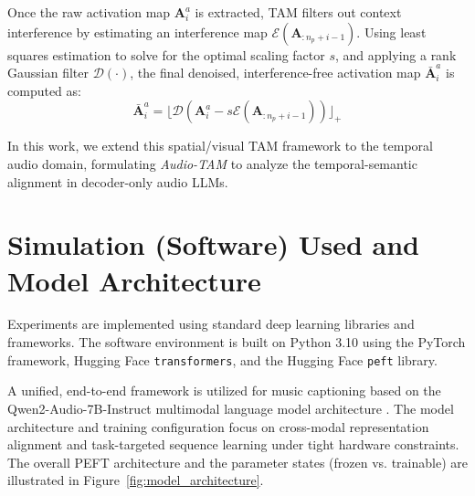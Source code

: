 \documentclass[12pt, conference, letterpaper]{IEEEtran}
\begin{document}
Once the raw activation map $\mathbf{A}^a_i$ is extracted, TAM filters out context interference by estimating an interference map $\mathcal{E}(\mathbf{A}_{:n_p+i-1})$. Using least squares estimation to solve for the optimal scaling factor $s$, and applying a rank Gaussian filter $\mathcal{D}(\cdot)$, the final denoised, interference-free activation map $\bar{\mathbf{A}}^a_i$ is computed as:
\begin{equation}
    \bar{\mathbf{A}}^a_i = \lfloor \mathcal{D}(\mathbf{A}^a_i - s\mathcal{E}(\mathbf{A}_{:n_p+i-1})) \rfloor_+
\end{equation}

In this work, we extend this spatial/visual TAM framework to the temporal audio domain, formulating \textit{Audio-TAM} to analyze the temporal-semantic alignment in decoder-only audio LLMs.

\section{Simulation (Software) Used and Model Architecture}
\label{sec:simulation_software}

Experiments are implemented using standard deep learning libraries and frameworks. The software environment is built on Python 3.10 using the PyTorch framework, Hugging Face \texttt{transformers}, and the Hugging Face \texttt{peft} library.

A unified, end-to-end framework is utilized for music captioning based on the Qwen2-Audio-7B-Instruct multimodal language model architecture \cite{qwen2audio}. The model architecture and training configuration focus on cross-modal representation alignment and task-targeted sequence learning under tight hardware constraints. The overall PEFT architecture and the parameter states (frozen vs. trainable) are illustrated in Figure~\ref{fig:model_architecture}.
\end{document}
